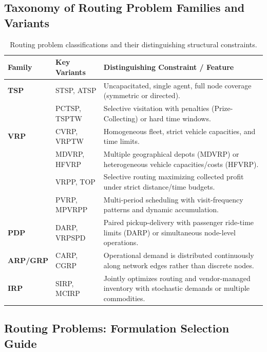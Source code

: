 \documentclass{article}
\begin{document}

\subsection*{Taxonomy of Routing Problem Families and Variants}

\begin{table}[H]
    \centering
    \caption{Routing problem classifications and their distinguishing structural constraints.}
    \begin{tabularx}{\textwidth}{@{} l l X @{}}
        \toprule
        \textbf{Family} & \textbf{Key Variants} & \textbf{Distinguishing Constraint / Feature} \\
        \midrule
        \textbf{TSP} & STSP, ATSP & Uncapacitated, single agent, full node coverage (symmetric or directed). \\
        & PCTSP, TSPTW & Selective visitation with penalties (Prize-Collecting) or hard time windows. \\
        \textbf{VRP} & CVRP, VRPTW & Homogeneous fleet, strict vehicle capacities, and time limits. \\
        & MDVRP, HFVRP & Multiple geographical depots (MDVRP) or heterogeneous vehicle capacities/costs (HFVRP). \\
        & VRPP, TOP & Selective routing maximizing collected profit under strict distance/time budgets. \\
        & PVRP, MPVRPP & Multi-period scheduling with visit-frequency patterns and dynamic accumulation. \\
        \textbf{PDP} & DARP, VRPSPD & Paired pickup-delivery with passenger ride-time limits (DARP) or simultaneous node-level operations. \\
        \textbf{ARP/GRP} & CARP, CGRP & Operational demand is distributed continuously along network edges rather than discrete nodes. \\
        \textbf{IRP} & SIRP, MCIRP & Jointly optimizes routing and vendor-managed inventory with stochastic demands or multiple commodities. \\
        \bottomrule
    \end{tabularx}
\end{table}

\subsection*{Routing Problems: Formulation Selection Guide}
\end{document}
